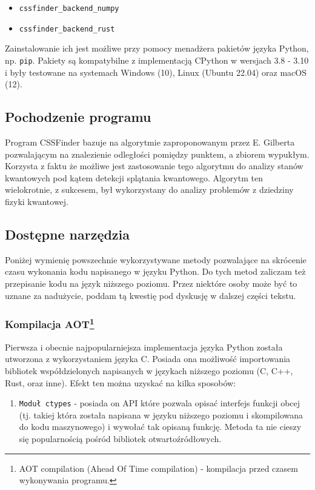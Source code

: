 \documentclass[12pt, a4paper]{article}
\newcommand{\code}[1]{\texttt{#1}}
\begin{document}
\begin{sloppypar}
\begin{itemize}
      \item \code{cssfinder\_backend\_numpy}\cite{CSSFinder_New_Numpy_PyPI}

      \item \code{cssfinder\_backend\_rust}\cite{CSSFinder_New_Rust_PyPI}
    \end{itemize}
    Zainstalowanie ich jest możliwe przy pomocy menadżera pakietów języka Python\cite{Packaging_PEPs},
    np. \code{pip}\cite{PIP}. Pakiety są kompatybilne z implementacją CPython w wersjach
    3.8 - 3.10 i były testowane na systemach Windows (10), Linux (Ubuntu 22.04) oraz macOS
    (12).

    \subsection{Pochodzenie programu}


    Program CSSFinder bazuje na algorytmie zaproponowanym przez E. Gilberta\cite{Lindemann_Gilbert}
    pozwalającym na znalezienie odległości pomiędzy punktem, a zbiorem wypukłym. Korzysta
    z faktu że możliwe jest zastosowanie tego algorytmu do analizy stanów kwantowych pod
    kątem detekcji splątania kwantowego\cite{MW_Hilbert_Schmidt_distance}\cite{MW_Gilbert_Quantum_Entanglement}.
    Algorytm ten wielokrotnie, z sukcesem, był wykorzystany do analizy problemów z
    dziedziny fizyki kwantowej\cite{MW_56_Year_Algorithm}\cite{MW_Variational_approach}.

    \subsection{Dostępne narzędzia}


    Poniżej wymienię powszechnie wykorzystywane metody pozwalające na skrócenie czasu
    wykonania kodu napisanego w języku Python. Do tych metod zaliczam też przepisanie kodu
    na język niższego poziomu. Przez niektóre osoby może być to uznane za nadużycie, poddam
    tą kwestię pod dyskusję w dalszej części tekstu.

    \subsubsection{Kompilacja AOT\protect\footnote{AOT compilation (Ahead Of Time compilation) - kompilacja przed czasem wykonywania programu.}}


    Pierwsza i obecnie najpopularniejsza implementacja języka Python została utworzona z
    wykorzystaniem języka C. Posiada ona możliwość importowania bibliotek
    współdzielonych napisanych w językach niższego poziomu (C, C++, Rust, oraz inne).
    Efekt ten można uzyskać na kilka sposobów:
    \begin{enumerate}
      \item \code{Moduł ctypes}\cite{Python_ctypes} - posiada on API które pozwala opisać
        interfejs funkcji obcej (tj. takiej która została napisana w języku niższego poziomu
        i skompilowana do kodu maszynowego) i wywołać tak opisaną funkcję. Metoda ta nie
        cieszy się popularnością pośród bibliotek otwartoźródłowych.


\end{enumerate}
\end{sloppypar}
\end{document}
